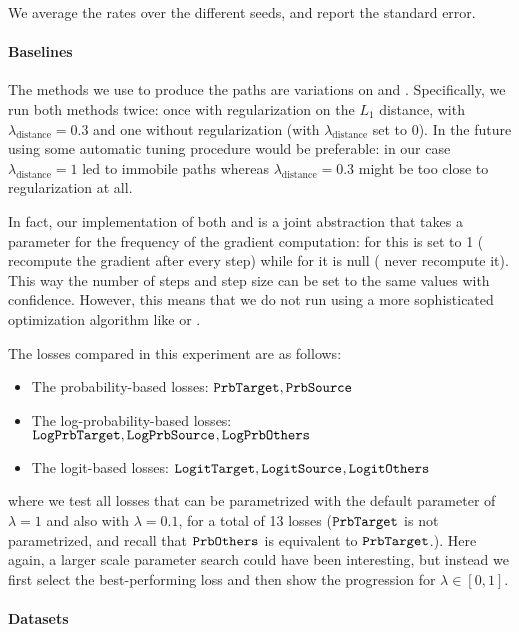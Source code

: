 \documentclass[../main.tex]{subfiles}
\begin{document}
We average the rates over the different seeds, and report the standard error.

\paragraph{Baselines}

The methods we use to produce the paths are variations on \ls{} and \revise{}.
Specifically, we run both methods twice: once with regularization on the $L_1$ distance, with $\lambda_\text{distance} = 0.3$ and one without regularization (with $\lambda_\text{distance}$ set to 0).
In the future using some automatic tuning procedure would be preferable: in our case $\lambda_\text{distance} = 1$ led to immobile paths whereas $\lambda_\text{distance} = 0.3$ might be too close to regularization at all.

In fact, our implementation of both \ls{} and \revise{} is a joint abstraction that takes a parameter for the frequency of the gradient computation: for \revise{} this is set to 1 (\ie{} recompute the gradient after every step) while for \revise{} it is null (\ie{} never recompute it).
This way the number of steps and step size can be set to the same values with confidence.
However, this means that we do not run \revise{} using a more sophisticated optimization algorithm like  or .

The losses compared in this experiment are as follows:
\begin{itemize}
    \item The probability-based losses: $\mathtt{PrbTarget}, \mathtt{PrbSource}_{}$
    \item The log-probability-based losses: $\mathtt{LogPrbTarget}, \mathtt{LogPrbSource}_{}, \mathtt{LogPrbOthers}_{}$
    \item The logit-based losses: $\mathtt{LogitTarget}, \mathtt{LogitSource}_{}, \mathtt{LogitOthers}_{}$
\end{itemize}
where we test all losses that can be parametrized with the default parameter of $\lambda = 1$ and also with $\lambda = 0.1$, for a total of 13 losses ($\mathtt{PrbTarget}$ is not parametrized, and recall that $\mathtt{PrbOthers}_{}$ is equivalent to $\mathtt{PrbTarget}$.).
Here again, a larger scale parameter search could have been interesting, but instead we first select the best-performing loss and then show the progression for $\lambda \in [0, 1]$.

\paragraph{Datasets}
\end{document}
